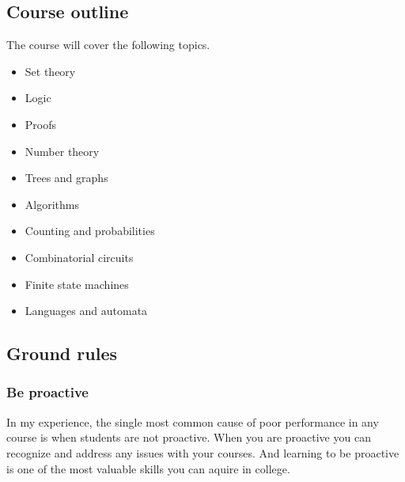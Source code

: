 \documentclass[letterpaper,10pt,english]{sphinxmanual}
\begin{document}
\subsection{Course outline}
\label{\detokenize{COMP271/organization:course-outline}}
The course will cover the following topics.
\begin{itemize}
\item {} 
Set theory

\item {} 
Logic

\item {} 
Proofs

\item {} 
Number theory

\item {} 
Trees and graphs

\item {} 
Algorithms

\item {} 
Counting and probabilities

\item {} 
Combinatorial circuits

\item {} 
Finite state machines

\item {} 
Languages and automata

\end{itemize}


\subsection{Ground rules}
\label{\detokenize{COMP271/organization:ground-rules}}

\subsubsection{Be proactive}
\label{\detokenize{COMP271/organization:be-proactive}}
In my experience, the single most common cause of poor performance in any course is when students are not proactive. When you are proactive you can recognize and address any issues with your courses. And learning to be proactive is one of the most valuable skills you can aquire in college.
\end{document}
